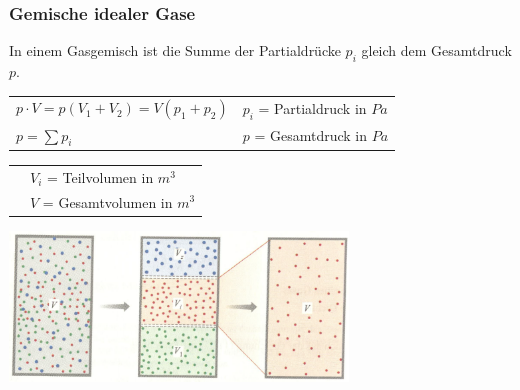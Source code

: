 		\subsubsection{Gemische idealer Gase}
			\begin{minipage}{10cm}
					\begin{flushleft}
						In einem Gasgemisch ist die Summe der Partialdrücke $p_i$ gleich dem Gesamtdruck $p$.
					\end{flushleft}
					\renewcommand{\arraystretch}{2.5}
					\begin{tabular}{ p{5cm} | p{7cm}}
						$p \cdot V = p(V_1 + V_2) = V(p_1 +p_2)$	&	$p_i$ = Partialdruck in $Pa$\\
						$p = \sum p_i$	& $p$ = Gesamtdruck in $Pa$\\
					\end{tabular}
					\renewcommand{\arraystretch}{1.5}
					\begin{tabular}{ p{5cm} | p{7cm}}
						& $V_i$ = Teilvolumen in $m^3$\\
						& $V$ = Gesamtvolumen in $m^3$\\
					\end{tabular} 
					\renewcommand{\arraystretch}{1}
			\end{minipage}
			\begin{minipage}{10cm}
				\vspace{-\ht\strutbox}\includegraphics[width=9cm]{./bilder/GemischIdealerGase.png}
			\end{minipage}
		
